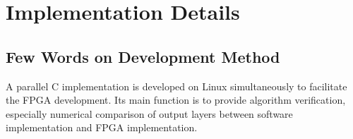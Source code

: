
\chapter{Implementation Details}

\section{Few Words on Development Method}

A parallel C implementation is developed on Linux simultaneously to facilitate the FPGA development.
Its main function is to provide algorithm verification, especially numerical comparison of output layers
between software implementation and FPGA implementation.

\clearpage %
